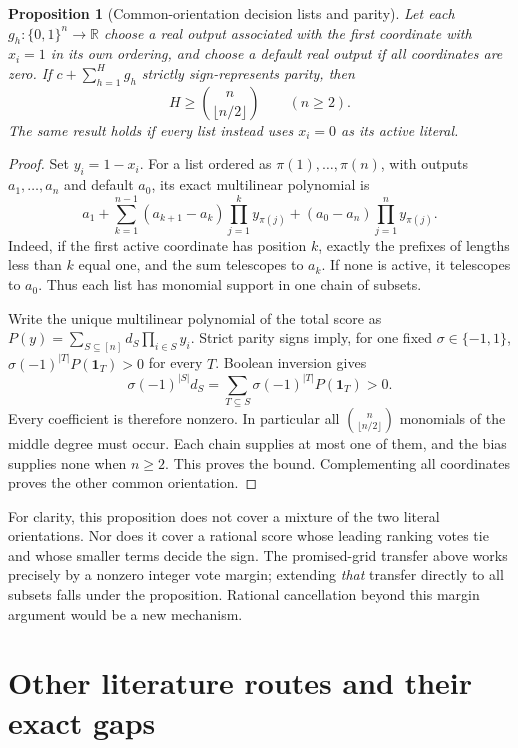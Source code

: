 \documentclass[11pt]{article}
\newtheorem{proposition}{Proposition}
\newcommand{\cube}{\{0,1\}^n}
\begin{document}
\begin{proposition}[Common-orientation decision lists and parity]
Let each $g_h:\cube\to\mathbb R$ choose a real output associated
with the first coordinate with $x_i=1$ in its own ordering, and
choose a default real output if all coordinates are zero.
If $c+\sum_{h=1}^H g_h$ strictly sign-represents parity, then
\[
 H\geq\binom{n}{\lfloor n/2\rfloor}\qquad(n\geq2).
\]
The same result holds if every list instead uses $x_i=0$ as its
active literal.
\end{proposition}
\begin{proof}
Set $y_i=1-x_i$. For a list ordered as
$\pi(1),\ldots,\pi(n)$, with outputs $a_1,\ldots,a_n$ and default
$a_0$, its exact multilinear polynomial is
\[
 a_1+\sum_{k=1}^{n-1}(a_{k+1}-a_k)
       \prod_{j=1}^k y_{\pi(j)}
       +(a_0-a_n)\prod_{j=1}^n y_{\pi(j)}.
\]
Indeed, if the first active coordinate has position $k$, exactly
the prefixes of lengths less than $k$ equal one, and the sum
telescopes to $a_k$. If none is active, it telescopes to $a_0$.
Thus each list has monomial support in one chain of subsets.

Write the unique multilinear polynomial of the total score as
$P(y)=\sum_{S\subseteq[n]}d_S\prod_{i\in S}y_i$. Strict parity
signs imply, for one fixed $\sigma\in\{-1,1\}$,
$\sigma(-1)^{|T|}P(\mathbf1_T)>0$ for every $T$. Boolean
inversion gives
\[
 \sigma(-1)^{|S|}d_S
 =\sum_{T\subseteq S}\sigma(-1)^{|T|}P(\mathbf1_T)>0.
\]
Every coefficient is therefore nonzero. In particular all
$\binom{n}{\lfloor n/2\rfloor}$ monomials of the middle degree
must occur. Each chain supplies at most one of them, and the bias
supplies none when $n\geq2$. This proves the bound. Complementing
all coordinates proves the other common orientation.
\end{proof}

For clarity, this proposition does not cover a mixture of the two
literal orientations. Nor does it cover a rational score whose leading
ranking votes tie and whose smaller terms decide the sign. The
promised-grid transfer above works precisely by a nonzero integer vote
margin; extending \emph{that} transfer directly to all subsets falls
under the proposition. Rational cancellation beyond this margin
argument would be a new mechanism.

\section{Other literature routes and their exact gaps}
\end{document}
